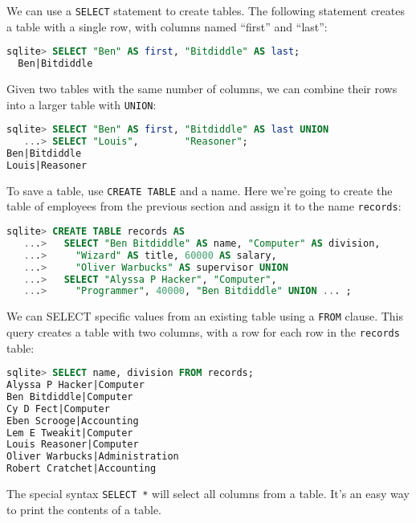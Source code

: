 We can use a \texttt{SELECT} statement to create tables. The following statement
creates a table with a single row, with columns named ``first'' and ``last'':

\begin{lstlisting}[language=SQL]
  sqlite> SELECT "Ben" AS first, "Bitdiddle" AS last;
  Ben|Bitdiddle
\end{lstlisting}

\vspace{20}
Given two tables with the same number of columns, we can combine their rows
into a larger table with \texttt{UNION}:

\begin{lstlisting}[language=SQL]
sqlite> SELECT "Ben" AS first, "Bitdiddle" AS last UNION
   ...> SELECT "Louis",        "Reasoner";
Ben|Bitdiddle
Louis|Reasoner
\end{lstlisting}

\begin{blocksection}
\vspace{20}
To save a table, use \texttt{CREATE TABLE} and a name.
Here we're going to create the table of employees from the
previous section and assign it to the name \texttt{records}:

\begin{lstlisting}[language=SQL]
sqlite> CREATE TABLE records AS
   ...>   SELECT "Ben Bitdiddle" AS name, "Computer" AS division,
   ...>     "Wizard" AS title, 60000 AS salary,
   ...>     "Oliver Warbucks" AS supervisor UNION
   ...>   SELECT "Alyssa P Hacker", "Computer",
   ...>     "Programmer", 40000, "Ben Bitdiddle" UNION ... ;
\end{lstlisting}

\end{blocksection}

\vspace{20}
We can SELECT specific values from an existing table using a \texttt{FROM} 
clause. This query creates a table with two columns, with a row for each row in the
\texttt{records} table:

\begin{lstlisting}[language=SQL]
sqlite> SELECT name, division FROM records;
Alyssa P Hacker|Computer
Ben Bitdiddle|Computer
Cy D Fect|Computer
Eben Scrooge|Accounting
Lem E Tweakit|Computer
Louis Reasoner|Computer
Oliver Warbucks|Administration
Robert Cratchet|Accounting

\end{lstlisting}

\vspace{20}
The special syntax \texttt{SELECT *} will select all columns from a table. It's
an easy way to print the contents of a table.

